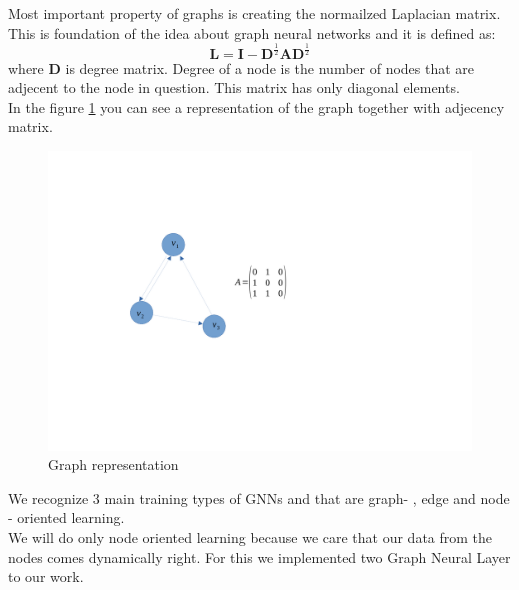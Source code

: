 Most important property of graphs is creating the normailzed Laplacian matrix. This is foundation of the idea about graph neural networks and it is defined as:
\begin{equation}
	\mathbf{L}= \mathbf{I} - \mathbf{D}^{\frac{1}{2}}\mathbf{A}\mathbf{D}^{\frac{1}{2}} 
\end{equation} where $\mathbf{D}$ is degree matrix. Degree of a node is the number of nodes that are adjecent to the node in question. This matrix has only diagonal elements.\\
In the figure \ref{graph} you can see a representation of the graph together with adjecency matrix.
\begin{figure}[h!]
	\includegraphics[width=15cm]{chapters/chapter4/graph}
	
	\caption{Graph representation}
	\label{graph}
\end{figure}
We recognize 3 main training types of GNNs and that are graph- , edge and node - oriented learning.\\
We will do only node oriented learning because we care that our data from the nodes comes dynamically right. For this we implemented two Graph Neural Layer to our work. 

